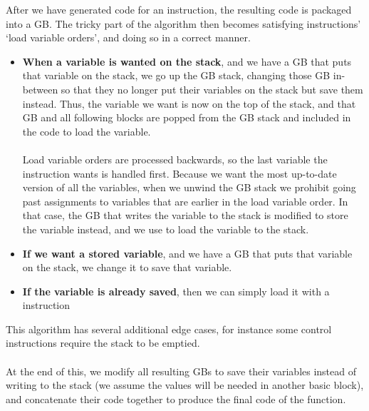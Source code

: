After we have generated code for an instruction, the resulting code is packaged into a GB. The tricky part of the algorithm then becomes satisfying instructions' `load variable orders', and doing so in a correct manner.
\begin{itemize}
\item \textbf{When a variable is wanted on the stack}, and we have a GB that puts that variable on the stack, we go up the GB stack, changing those GB in-between so that they no longer put their variables on the stack but save them instead. Thus, the variable we want is now on the top of the stack, and that GB and all following blocks are popped from the GB stack and included in the code to load the variable.
\\\\
Load variable orders are processed backwards, so the last variable the instruction wants is handled first. Because we want the most up-to-date version of all the variables, when we unwind the GB stack we prohibit going past assignments to variables that are earlier in the load variable order. In that case, the GB that writes the variable to the stack is modified to store the variable instead, and we use  to load the variable to the stack.
\item \textbf{If we want a stored variable}, and we have a GB that puts that variable on the stack, we change it to save that variable.
\item \textbf{If the variable is already saved}, then we can simply load it with a  instruction
\end{itemize}
This algorithm has several additional edge cases, for instance some control instructions require the stack to be emptied.
\\\\
At the end of this, we modify all resulting GBs to save their variables instead of writing to the stack (we assume the values will be needed in another basic block), and concatenate their code together to produce the final code of the function.

